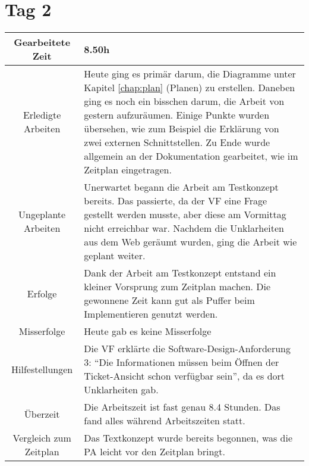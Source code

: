 \section{Tag 2}
\begin{tabularx}{\textwidth}[H]{|c|X|}
  \hline
  Gearbeitete Zeit & 8.50h \\ \hline
  Erledigte Arbeiten & Heute ging es primär darum, die Diagramme unter Kapitel \ref{chap:plan}
  (Planen) zu erstellen. Daneben ging es noch ein bisschen darum, die Arbeit von gestern
  aufzuräumen. Einige Punkte wurden übersehen, wie zum Beispiel die Erklärung von zwei
  externen Schnittstellen. Zu Ende wurde allgemein an der Dokumentation gearbeitet, wie
  im Zeitplan eingetragen. \\ \hline
  Ungeplante Arbeiten & Unerwartet begann die Arbeit am Testkonzept bereits. Das passierte,
  da der VF eine Frage gestellt werden musste, aber diese am Vormittag nicht erreichbar war. Nachdem
  die Unklarheiten aus dem Web geräumt wurden, ging die Arbeit wie geplant weiter.
  \\ \hline
  Erfolge & Dank der Arbeit am Testkonzept entstand ein kleiner Vorsprung zum
  Zeitplan machen. Die gewonnene Zeit kann gut als Puffer beim Implementieren genutzt werden.
  \\ \hline
  Misserfolge & Heute gab es keine Misserfolge \\ \hline
  Hilfestellungen & Die VF erklärte die Software-Design-Anforderung 3: \enquote{Die 
  Informationen müssen beim Öffnen der Ticket-Ansicht schon verfügbar sein}, da es dort Unklarheiten gab. \\ \hline
  Überzeit & Die Arbeitszeit ist fast genau 8.4 Stunden. Das fand alles während Arbeitszeiten statt. \\ \hline
  Vergleich zum Zeitplan & Das Textkonzept wurde bereits begonnen, was die PA leicht vor den Zeitplan bringt. \\ \hline
\end{tabularx}

\newpage

